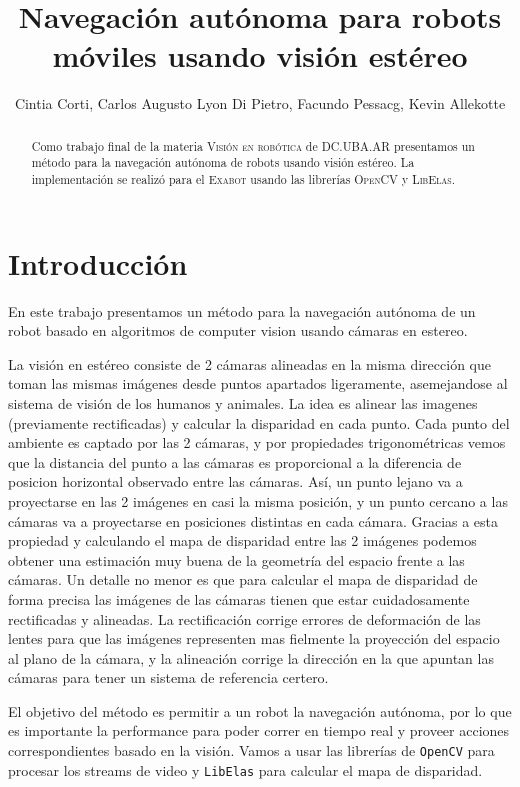 \documentclass[journal,a4paper]{IEEEtran}
\begin{document}
\title{Navegación autónoma para robots móviles usando visión estéreo}
\author{Cintia Corti, Carlos Augusto Lyon Di Pietro, Facundo Pessacg, Kevin Allekotte}

\maketitle

\begin{abstract}
Como trabajo final de la materia \textsc{Visión en robótica} de \textsc{DC.UBA.AR}
presentamos un método para la navegación autónoma de robots usando visión estéreo.
La implementación se realizó para el \textsc{Exabot} usando las librerías \textsc{OpenCV} y \textsc{LibElas}.
\end{abstract}

\section{Introducción}
En este trabajo presentamos un método para la navegación autónoma de un robot basado en algoritmos de computer vision usando cámaras en estereo.

La visión en estéreo consiste de 2 cámaras alineadas en la misma dirección que toman las mismas imágenes desde puntos apartados ligeramente,
asemejandose al sistema de visión de los humanos y animales.
La idea es alinear las imagenes (previamente rectificadas) y calcular la disparidad en cada punto.
Cada punto del ambiente es captado por las 2 cámaras, y por propiedades trigonométricas vemos que la distancia del punto a las cámaras es proporcional a la diferencia de posicion horizontal observado entre las cámaras.
Así, un punto lejano va a proyectarse en las 2 imágenes en casi la misma posición, y un punto cercano a las cámaras va a proyectarse en posiciones distintas en cada cámara. 
Gracias a esta propiedad y calculando el mapa de disparidad entre las 2 imágenes podemos obtener una estimación muy buena de la geometría del espacio frente a las cámaras.
Un detalle no menor es que para calcular el mapa de disparidad de forma precisa las imágenes de las cámaras tienen que estar cuidadosamente rectificadas y alineadas. La rectificación corrige errores de deformación de las lentes para que las imágenes representen mas fielmente la proyección del espacio al plano de la cámara, y la alineación corrige la dirección en la que apuntan las cámaras para tener un sistema de referencia certero.

El objetivo del método es permitir a un robot la navegación autónoma, por lo que es importante la performance para poder correr en tiempo real y proveer acciones correspondientes basado en la visión. Vamos a usar las librerías de \texttt{OpenCV} para procesar los streams de video y \texttt{LibElas} para calcular el mapa de disparidad.
\end{document}
